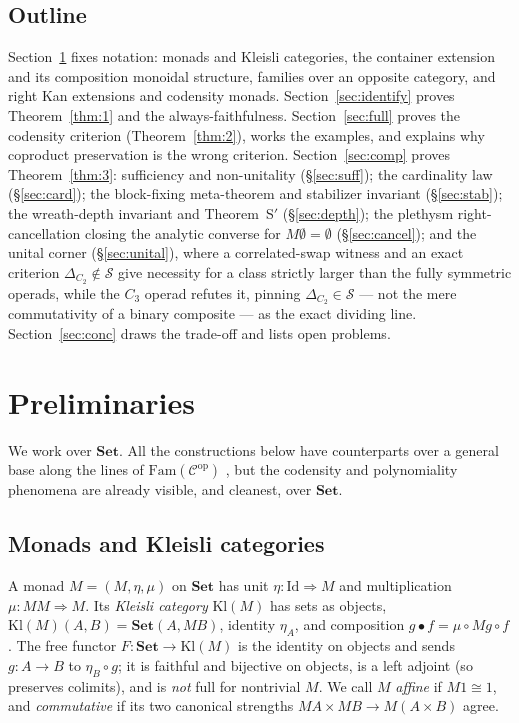 \documentclass[11pt]{amsart}
\theoremstyle{plain}
\theoremstyle{definition}
\newcommand{\Set}{\mathbf{Set}}
\newcommand{\Fam}{\mathrm{Fam}}
\newcommand{\Kl}{\mathrm{Kl}}
\newcommand{\op}{\mathrm{op}}
\newcommand{\Id}{\mathrm{Id}}
\begin{document}
\subsection*{Outline}
Section~\ref{sec:prelim} fixes notation: monads and Kleisli categories, the container extension and
its composition monoidal structure, families over an opposite category, and right Kan extensions and
codensity monads. Section~\ref{sec:identify} proves Theorem~\ref{thm:1} and the always-faithfulness.
Section~\ref{sec:full} proves the codensity criterion (Theorem~\ref{thm:2}), works the examples, and
explains why coproduct preservation is the wrong criterion. Section~\ref{sec:comp} proves
Theorem~\ref{thm:3}: sufficiency and non-unitality (\S\ref{sec:suff}); the cardinality law
(\S\ref{sec:card}); the block-fixing meta-theorem and stabilizer invariant (\S\ref{sec:stab}); the
wreath-depth invariant and Theorem~S$'$ (\S\ref{sec:depth}); the plethysm right-cancellation closing the
analytic converse for $M\emptyset=\emptyset$ (\S\ref{sec:cancel}); and the unital corner
(\S\ref{sec:unital}), where a correlated-swap witness and an exact criterion $\Delta_{C_2}\notin\mathcal
S$ give necessity for a class strictly larger than the fully symmetric operads, while the $C_3$ operad
refutes it, pinning $\Delta_{C_2}\in\mathcal S$ --- not the mere commutativity of a binary composite ---
as the exact dividing line.
Section~\ref{sec:conc} draws the trade-off and lists open problems.

\section{Preliminaries}\label{sec:prelim}

We work over $\Set$. All the constructions below have counterparts over a general base along the
lines of $\Fam(\mathcal C^{\op})$ \cite{DJN}, but the codensity and polynomiality phenomena are
already visible, and cleanest, over $\Set$.

\subsection{Monads and Kleisli categories}
A monad $M=(M,\eta,\mu)$ on $\Set$ has unit $\eta\colon\Id\Rightarrow M$ and multiplication
$\mu\colon MM\Rightarrow M$. Its \emph{Kleisli category} $\Kl(M)$ has sets as objects,
$\Kl(M)(A,B)=\Set(A,MB)$, identity $\eta_A$, and composition $g\bullet f=\mu\circ Mg\circ f$. The
free functor $F\colon\Set\to\Kl(M)$ is the identity on objects and sends $g\colon A\to B$ to
$\eta_B\circ g$; it is faithful and bijective on objects, is a left adjoint (so preserves colimits),
and is \emph{not} full for nontrivial $M$. We call $M$ \emph{affine} if $M1\cong1$, and
\emph{commutative} if its two canonical strengths $MA\times MB\to M(A\times B)$ agree.
\end{document}
